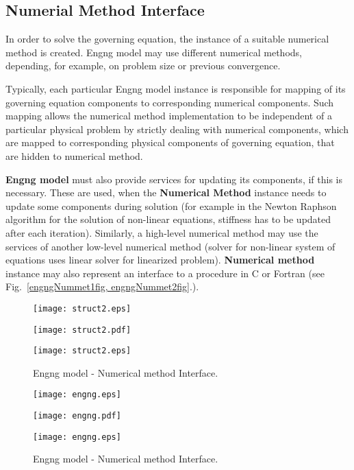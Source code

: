 \documentclass[a4paper]{article}
\newcommand{\class}[1]{{\bf #1}}
\begin{document}
\subsection{Numerial Method Interface}
In order
to solve the governing equation, the  instance of a suitable numerical method
is created. Engng model may use different numerical methods,
depending, for example, on problem size or previous convergence. 

Typically, each particular Engng model instance is responsible
for mapping of its governing equation components to corresponding
numerical components. Such mapping allows the numerical method implementation
to be independent of a particular physical problem by strictly dealing
with numerical components, which are mapped to corresponding physical
components of governing equation, that are  hidden to numerical method.

\class{Engng model} must also provide services for updating its
components, if this is necessary. These are used, when the \class{Numerical
Method} instance needs to update  some components during solution (for
example in the Newton Raphson algorithm for the solution of non-linear
equations, stiffness has to be updated after each
iteration). Similarly,  
a high-level numerical method may use the services of another
low-level numerical method (solver for non-linear system  of equations
uses  linear solver for linearized problem). \class{Numerical method}
instance may also represent an interface to a procedure in C or
Fortran (see Fig.~\ref{engngNummet1fig, engngNummet2fig}.). 

\begin{figure}[tb]
\begin{htmlonly}
  \centerline{\texttt{[image: struct2.eps]}}
\end{htmlonly}
\ifpdf
\centerline{\texttt{[image: struct2.pdf]}}
\else
\centerline{\texttt{[image: struct2.eps]}}
\fi
\caption{Engng model - Numerical method Interface.}
\label{engngNummet1fig}
\end{figure}



\begin{figure}[tb]
\begin{htmlonly}
  \centerline{\texttt{[image: engng.eps]}}
\end{htmlonly}
\ifpdf
\centerline{\texttt{[image: engng.pdf]}}
\else
\centerline{\texttt{[image: engng.eps]}}
\fi
\caption{Engng model - Numerical method Interface.}
\label{engngNummet2fig}
\end{figure}
\end{document}
